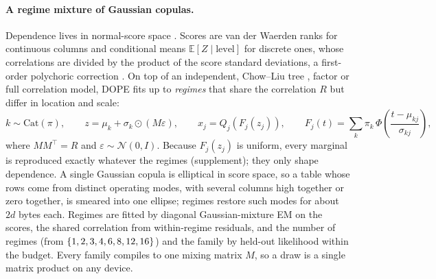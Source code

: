 \paragraph{A regime mixture of Gaussian copulas.}
Dependence lives in normal-score space \citep{sklar1959,nelsen2006copulas}. Scores are van der Waerden
ranks for continuous columns and conditional means $\mathbb{E}[Z\mid\text{level}]$ for discrete ones, whose
correlations are divided by the product of the score standard deviations, a first-order polychoric
correction \citep{olsson1979polychoric}. On top of an independent, Chow--Liu tree
\citep{chow1968dependence}, factor or full correlation model, DOPE fits up to \CfgMaxRegimes{}
\emph{regimes} that share the correlation $R$ but differ in location and scale:
\begin{equation}
  k\sim\mathrm{Cat}(\pi),\qquad z=\mu_k+\sigma_k\odot(M\varepsilon),\qquad x_j=Q_j\!\left(F_j(z_j)\right),
  \qquad F_j(t)=\sum_k \pi_k\,\Phi\!\left(\frac{t-\mu_{kj}}{\sigma_{kj}}\right),
  \label{eq:regimes}
\end{equation}
where $MM^\top=R$ and $\varepsilon\sim\mathcal{N}(0,I)$. Because $F_j(z_j)$ is uniform, every marginal
is reproduced exactly whatever the regimes (supplement); they only shape dependence. A single Gaussian
copula is elliptical in score space, so a table whose rows come from distinct operating modes, with
several columns high together or zero together, is smeared into one ellipse; regimes restore such modes
for about $2d$ bytes each. Regimes are fitted by diagonal
Gaussian-mixture EM \citep{dempster1977em} on the scores, the shared correlation from
within-regime residuals, and the number of regimes (from $\{1,2,3,4,6,8,12,16\}$) and the family by
held-out likelihood within the budget. Every family compiles to one mixing matrix $M$, so a draw is
a single matrix product on any device.

